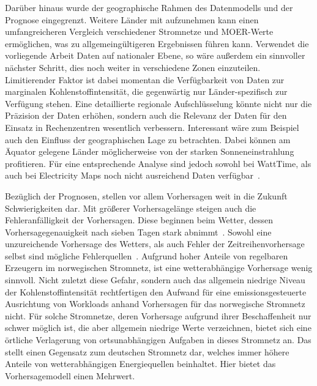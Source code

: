 Darüber hinaus wurde der geographische Rahmen des Datenmodells und der Prognose eingegrenzt.
Weitere Länder mit aufzunehmen kann einen umfangreicheren Vergleich verschiedener Stromnetze und \ac{MOER}-Werte ermöglichen, was zu allgemeingültigeren Ergebnissen führen kann.
Verwendet die vorliegende Arbeit Daten auf nationaler Ebene, so wäre außerdem ein sinnvoller nächster Schritt, dies noch weiter in verschiedene Zonen einzuteilen.
Limitierender Faktor ist dabei momentan die Verfügbarkeit von Daten zur marginalen Kohlenstoffintensität, die gegenwärtig nur Länder-spezifisch zur Verfügung stehen.
Eine detaillierte regionale Aufschlüsselung könnte nicht nur die Präzision der Daten erhöhen, sondern auch die Relevanz der Daten für den Einsatz in Rechenzentren wesentlich verbessern.
Interessant wäre zum Beispiel auch den Einfluss der geographischen Lage zu betrachten.
Dabei können am Äquator gelegene Länder möglicherweise von der starken Sonneneinstrahlung profitieren.
Für eine entsprechende Analyse sind jedoch sowohl bei WattTime, als auch bei Electricity Maps noch nicht ausreichend Daten verfügbar~\cite{WattTime.20230823}\cite{ElectricityMaps.20240305T20:54:29.000Z}.

Bezüglich der Prognosen, stellen vor allem Vorhersagen weit in die Zukunft Schwierigkeiten dar.
Mit größerer Vorhersagelänge steigen auch die Fehleranfälligkeit der Vorhersagen.
Diese beginnen beim Wetter, dessen Vorhersagegenauigkeit nach sieben Tagen stark abnimmt~\cite{Lam.2022}.
Sowohl eine unzureichende Vorhersage des Wetters, als auch Fehler der Zeitreihenvorhersage selbst sind mögliche Fehlerquellen~\cite{Wiesner.2021}.
Aufgrund hoher Anteile von regelbaren Erzeugern im norwegischen Stromnetz, ist eine wetterabhängige Vorhersage wenig sinnvoll.
Nicht zuletzt diese Gefahr, sondern auch das allgemein niedrige Niveau der Kohlenstoffintensität rechtfertigen den Aufwand für eine emissionsgesteuerte Ausrichtung von Workloads anhand Vorhersagen für das norwegische Stromnetz nicht.
Für solche Stromnetze, deren Vorhersage aufgrund ihrer Beschaffenheit nur schwer möglich ist, die aber allgemein niedrige Werte verzeichnen, bietet sich eine örtliche Verlagerung von ortsunabhängigen Aufgaben in dieses Stromnetz an.
Das stellt einen Gegensatz zum deutschen Stromnetz dar, welches immer höhere Anteile von wetterabhängigen Energiequellen beinhaltet.
Hier bietet das Vorhersagemodell einen Mehrwert.

